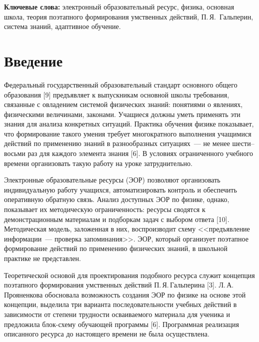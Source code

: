 \documentclass[14pt]{extarticle}
\begin{document}
\vspace{0.3cm}
\noindent\textbf{Ключевые слова:} электронный образовательный ресурс, физика, основная школа, теория поэтапного формирования умственных действий, П.\,Я.~Гальперин, система знаний, адаптивное обучение.

\vspace{0.5cm}


\section*{Введение}

Федеральный государственный образовательный стандарт основного общего образования [9]
предъявляет к выпускникам основной школы требования, связанные с овладением
системой физических знаний: понятиями о явлениях, физическими величинами, законами.
Учащиеся должны уметь применять эти знания для анализа конкретных ситуаций.
Практика обучения физике показывает, что формирование такого умения требует
многократного выполнения учащимися действий по применению знаний в разнообразных
ситуациях~--- не менее шести--восьми раз для каждого элемента знания [6].
В условиях ограниченного учебного времени организовать такую работу на уроке затруднительно.

Электронные образовательные ресурсы (ЭОР) позволяют организовать
индивидуальную работу учащихся, автоматизировать контроль и обеспечить
оперативную обратную связь. Анализ доступных ЭОР по физике, однако,
показывает их методическую ограниченность: ресурсы
сводятся к демонстрационным материалам и подборкам задач с выбором ответа [10].
Методическая модель, заложенная в них, воспроизводит схему <<предъявление
информации~--- проверка запоминания>>. ЭОР, который организует поэтапное
формирование действий по применению физических знаний, в школьной практике
не представлен.

Теоретической основой для проектирования подобного ресурса служит концепция
поэтапного формирования умственных действий П.\,Я.\,Гальперина [3].
Л.\,А.\,Прояненкова обосновала возможность создания ЭОР по физике на основе
этой концепции, выделила три варианта последовательности учебных действий
в зависимости от степени трудности осваиваемого материала для ученика
и предложила блок-схему обучающей программы [6]. Программная реализация
описанного ресурса до настоящего времени не была осуществлена.
\end{document}
